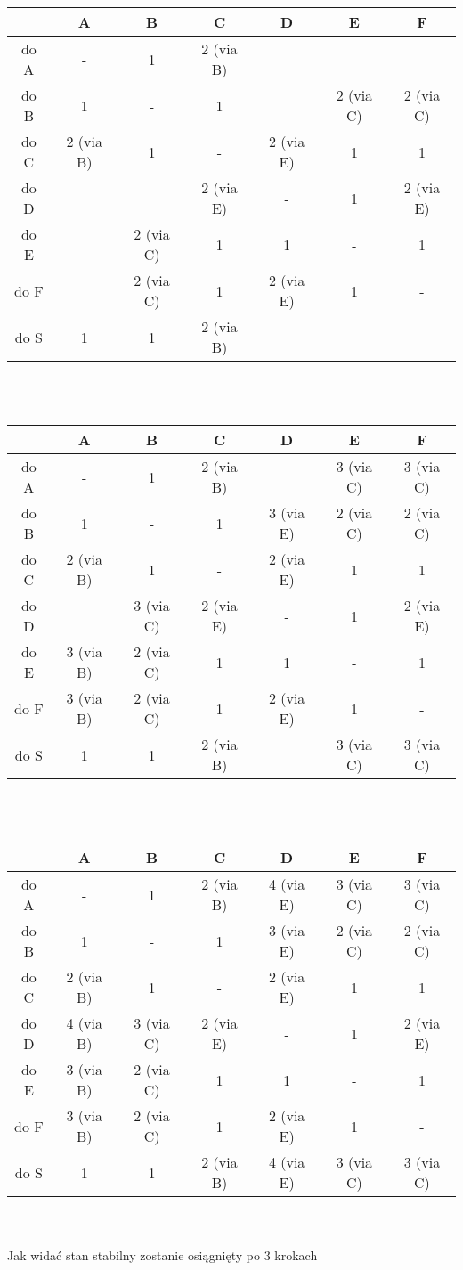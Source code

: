 \documentclass[11pt,wide]{article}
\begin{document}
\begin{tabular}{|c|c|c|c|c|c|c|}\hline
 	 & A & B & C 		 & D & E & F\\
\hline 
do A & - & 1 & 2 (via B) & & &\\
\hline 
do B & 1 & - & 1 		 & & 2 (via C) & 2 (via C)\\
\hline 
do C & 2 (via B) & 1 & - & 2 (via E) & 1 & 1\\
\hline 
do D & & & 2 (via E) & - & 1 & 2 (via E)\\
\hline 
do E & & 2 (via C) & 1 & 1 & - & 1\\
\hline
do F & & 2 (via C) & 1 & 2 (via E) & 1 & -\\
\hline
do S & 1 & 1 & 2 (via B) & & & \\
\hline
\end{tabular}\\\\

\begin{tabular}{|c|c|c|c|c|c|c|}\hline
 & A & B & C & D & E & F\\
\hline 
do A & - & 1 & 2 (via B) &  & 3 (via C) &  3 (via C)\\
\hline 
do B & 1 & - & 1 & 3 (via E) & 2 (via C) & 2 (via C)\\
\hline 
do C & 2 (via B) & 1 & - & 2 (via E) & 1 & 1\\
\hline 
do D & 			 & 3 (via C) & 2 (via E) & - & 1 & 2 (via E)\\
\hline 
do E & 3 (via B) & 2 (via C) & 1 & 1 & - & 1\\
\hline
do F & 3 (via B) & 2 (via C) & 1 & 2 (via E) & 1 & -\\
\hline
do S & 1 & 1 & 2 (via B) & & 3 (via C) & 3 (via C) \\
\hline
\end{tabular}\\\\

\begin{tabular}{|c|c|c|c|c|c|c|}\hline
 & A & B & C & D & E & F\\
\hline 
do A & - & 1 & 2 (via B) & 4 (via E)  & 3 (via C) &  3 (via C)\\
\hline 
do B & 1 & - & 1 & 3 (via E) & 2 (via C) & 2 (via C)\\
\hline 
do C & 2 (via B) & 1 & - & 2 (via E) & 1 & 1\\
\hline 
do D & 4 (via B) & 3 (via C) & 2 (via E) & - & 1 & 2 (via E)\\
\hline 
do E & 3 (via B) & 2 (via C) & 1 & 1 & - & 1\\
\hline
do F & 3 (via B) & 2 (via C) & 1 & 2 (via E) & 1 & -\\
\hline
do S & 1 & 1 & 2 (via B) & 4 (via E) & 3 (via C) & 3 (via C) \\
\hline
\end{tabular}\\\\
Jak widać stan stabilny zostanie osiągnięty po 3 krokach
\end{document}
